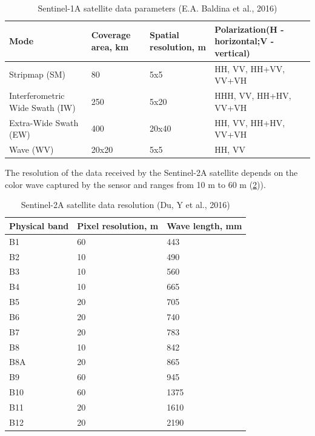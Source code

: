 	{\setlength{\extrarowheight}{15pt}%
	\begin{table}[H]
		\begin{center}
			\caption{Sentinel-1A satellite data parameters (E.A. Baldina et al., 2016)}
			\label{tab:sent-char}
			\begin{tabularx}{\textwidth}{|X|X|X|X|}
				\hline
				\textbf{Mode} & \textbf{Coverage area, km} & \textbf{Spatial resolution, m} & \textbf{Polarization\newline(H - horizontal;\newline V - vertical)}\\
				\hline
				Stripmap (SM) & 80 & 5x5 & HH, VV, HH+VV, VV+VH \\
				\hline
				Interferometric Wide Swath (IW) & 250 & 5x20 & HHH, VV, HH+HV, VV+VH \\
				\hline
				Extra-Wide Swath (EW) & 400 & 20x40 & HH, VV, HH+HV, VV+VH \\
				\hline
				Wave (WV) & 20x20 & 5x5 & HH, VV \\
				\hline
			\end{tabularx}
		\end{center}
	\end{table}

	The resolution of the data received by the Sentinel-2A satellite depends on the color wave captured by the sensor and ranges from 10 m to 60 m (\ref{tab:sent-res})).
	
	{\setlength{\extrarowheight}{15pt}%
	\begin{table}[H]
		\begin{center}
			\caption{Sentinel-2A satellite data resolution (Du, Y et al., 2016)}
			\label{tab:sent-res}
			\begin{tabularx}{\textwidth}{|X|X|X|}
				\hline
				\textbf{Physical band} & \textbf{Pixel resolution, m} & \textbf{Wave length, mm}\\
				\hline
				B1 & 60 & 443 \\
				\hline
				B2 & 10 & 490 \\
				\hline
				B3 & 10 & 560 \\
				\hline
				B4 & 10 & 665 \\
				\hline
				B5 & 20 & 705 \\
				\hline
				B6 & 20 & 740 \\
				\hline
				B7 & 20 & 783 \\
				\hline
				B8 & 10 & 842 \\
				\hline
				B8A & 20 & 865 \\
				\hline
				B9 & 60 & 945 \\
				\hline
				B10 & 60 & 1375 \\
				\hline
				B11 & 20 & 1610 \\
				\hline
				B12 & 20 & 2190 \\
				\hline
			\end{tabularx}
		\end{center}
	\end{table}
		
}}
